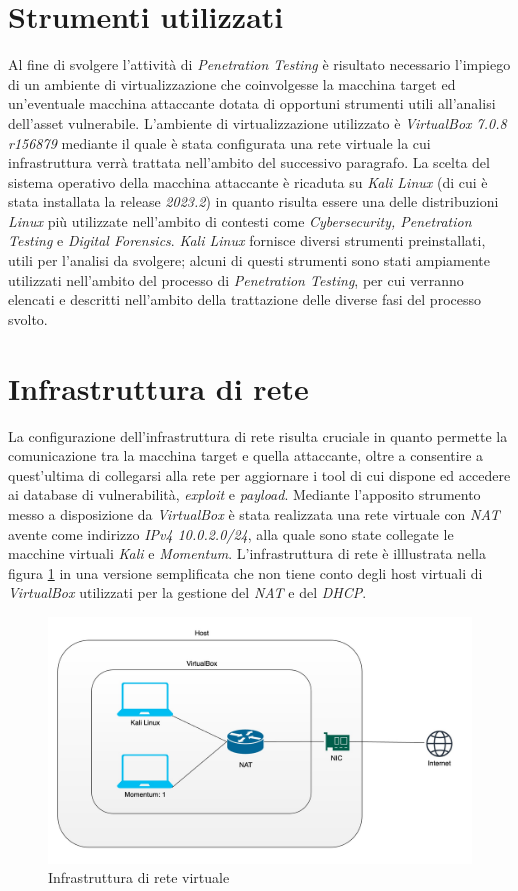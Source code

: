 \section{Strumenti utilizzati} 
Al fine di svolgere l'attività di \emph{Penetration Testing} è risultato necessario l'impiego di un ambiente di virtualizzazione che coinvolgesse la macchina target ed un'eventuale macchina attaccante dotata di opportuni strumenti utili all'analisi dell'asset vulnerabile. L'ambiente di virtualizzazione utilizzato è \emph{VirtualBox 7.0.8 r156879} mediante il quale è stata configurata una rete virtuale la cui infrastruttura verrà trattata nell'ambito del successivo paragrafo. La scelta del sistema operativo della macchina attaccante è ricaduta su \emph{Kali Linux} (di cui è stata installata la release \emph{2023.2}) in quanto risulta essere una delle distribuzioni \emph{Linux} più utilizzate nell'ambito di contesti come \emph{Cybersecurity, Penetration Testing} e \emph{Digital Forensics}. \emph{Kali Linux} fornisce diversi strumenti preinstallati, utili per l'analisi da svolgere; alcuni di questi strumenti sono stati ampiamente utilizzati nell'ambito del processo di \emph{Penetration Testing}, per cui verranno elencati e descritti nell'ambito della trattazione delle diverse fasi del processo svolto. 
\section{Infrastruttura di rete} 
La configurazione dell'infrastruttura di rete risulta cruciale in quanto permette la comunicazione tra la macchina target e quella attaccante, oltre a consentire a quest'ultima di collegarsi alla rete per aggiornare i tool di cui dispone ed accedere ai database di vulnerabilità, \emph{exploit} e \emph{payload}. Mediante l'apposito strumento messo a disposizione da \emph{VirtualBox} è stata realizzata una rete virtuale con \emph{NAT} avente come indirizzo \emph{IPv4 10.0.2.0/24}, alla quale sono state collegate le macchine virtuali \emph{Kali} e \emph{Momentum}. L'infrastruttura di rete è illlustrata nella figura \ref{fig:virtualbox} in una versione semplificata che non tiene conto degli host virtuali di \emph{VirtualBox} utilizzati per la gestione del \emph{NAT} e del \emph{DHCP}. 
\begin{figure}[h]
    \centering
    \includegraphics[scale=0.2]{capitoli/images/virtualbox.jpeg}
    \caption{Infrastruttura di rete virtuale}
    \label{fig:virtualbox}
\end{figure}
